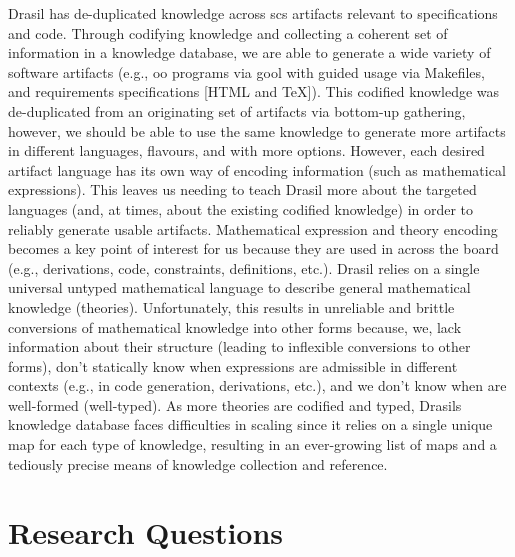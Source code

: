 Drasil has de-duplicated knowledge across \acs{scs} artifacts relevant to
specifications and code. Through codifying knowledge and collecting a coherent
set of information in a knowledge database, we are able to generate a wide
variety of software artifacts (e.g., \acs{oo} programs via \acs{gool} with
guided usage via Makefiles, and requirements specifications [HTML and TeX]).
This codified knowledge was de-duplicated from an originating set of artifacts
via bottom-up gathering, however, we should be able to use the same knowledge to
generate more artifacts in different languages, flavours, and with more options.
However, each desired artifact language has its own way of encoding information
(such as mathematical expressions). This leaves us needing to teach Drasil more
about the targeted languages (and, at times, about the existing codified
knowledge) in order to reliably generate usable artifacts. Mathematical
expression and theory encoding becomes a key point of interest for us because
they are used in across the board (e.g., derivations, code, constraints,
definitions, etc.). Drasil relies on a single universal untyped mathematical
language to describe general mathematical knowledge (theories). Unfortunately,
this results in unreliable and brittle conversions of mathematical knowledge
into other forms because, we, lack information about their structure (leading to
inflexible conversions to other forms), don't statically know when expressions
are admissible in different contexts (e.g., in code generation, derivations,
etc.), and we don't know when are well-formed (well-typed). As more theories are
codified and typed, Drasils knowledge database faces difficulties in scaling
since it relies on a single unique map for each type of knowledge, resulting in
an ever-growing list of maps and a tediously precise means of knowledge
collection and reference.

\section{Research Questions}
\label{sec:intro:researchquestions}

